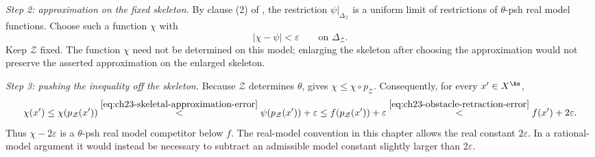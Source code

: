 \emph{Step 2: approximation on the fixed skeleton.}
By clause (2) of , the restriction
\(\psi|_{\Delta_{\mathcal Z}}\) is a uniform limit of restrictions of
\(\theta\)-psh real model functions.  Choose such a function \(\chi\)
with
\begin{equation}\label{eq:ch23-skeletal-approximation-error}
 \bigl|\chi-\psi\bigr|<\varepsilon
 \qquad\text{on }\Delta_{\mathcal Z}.
\end{equation}
Keep \(\mathcal Z\) fixed.  The function \(\chi\) need not be determined
on this model; enlarging the skeleton after choosing the approximation
would not preserve the asserted approximation on the enlarged skeleton.

\emph{Step 3: pushing the inequality off the skeleton.}
Because \(\mathcal Z\) determines \(\theta\),
 gives
\(\chi\leq\chi\circ p_{\mathcal Z}\).  Consequently, for every
\(x'\in X^{\An}\),
\[
 \chi(x')\leq\chi(p_{\mathcal Z}(x'))
 \overset{\eqref{eq:ch23-skeletal-approximation-error}}{<}
 \psi(p_{\mathcal Z}(x'))+\varepsilon
 \leq f(p_{\mathcal Z}(x'))+\varepsilon
 \overset{\eqref{eq:ch23-obstacle-retraction-error}}{<}
 f(x')+2\varepsilon.
\]
Thus \(\chi-2\varepsilon\) is a \(\theta\)-psh real model
competitor below \(f\).  The real-model convention in this chapter
allows the real constant \(2\varepsilon\).  In a rational-model
argument it would instead be necessary to subtract an admissible
model constant slightly larger than \(2\varepsilon\).

